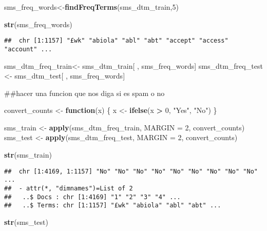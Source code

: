 \documentclass[]{article}
\newenvironment{Shaded}{\begin{snugshade}}{\end{snugshade}}
\newcommand{\KeywordTok}[1]{\textcolor[rgb]{0.13,0.29,0.53}{\textbf{#1}}}
\newcommand{\DataTypeTok}[1]{\textcolor[rgb]{0.13,0.29,0.53}{#1}}
\newcommand{\DecValTok}[1]{\textcolor[rgb]{0.00,0.00,0.81}{#1}}
\newcommand{\StringTok}[1]{\textcolor[rgb]{0.31,0.60,0.02}{#1}}
\newcommand{\ControlFlowTok}[1]{\textcolor[rgb]{0.13,0.29,0.53}{\textbf{#1}}}
\newcommand{\OperatorTok}[1]{\textcolor[rgb]{0.81,0.36,0.00}{\textbf{#1}}}
\newcommand{\NormalTok}[1]{#1}
\begin{document}
\begin{Shaded}
\begin{Highlighting}[]
\NormalTok{sms_freq_words<-}\KeywordTok{findFreqTerms}\NormalTok{(sms_dtm_train,}\DecValTok{5}\NormalTok{)}

\KeywordTok{str}\NormalTok{(sms_freq_words)}
\end{Highlighting}
\end{Shaded}

\begin{verbatim}
##  chr [1:1157] "£wk" "abiola" "abl" "abt" "accept" "access" "account" ...
\end{verbatim}

\begin{Shaded}
\begin{Highlighting}[]
\NormalTok{sms_dtm_freq_train<-}\StringTok{ }\NormalTok{sms_dtm_train[ , sms_freq_words]}
\NormalTok{sms_dtm_freq_test <-}\StringTok{ }\NormalTok{sms_dtm_test[ , sms_freq_words]         }


\NormalTok{##hacer una funcion que nos diga si es spam o no}

\NormalTok{convert_counts <-}\StringTok{ }\ControlFlowTok{function}\NormalTok{(x) \{}
\NormalTok{    x <-}\StringTok{ }\KeywordTok{ifelse}\NormalTok{(x }\OperatorTok{>}\StringTok{ }\DecValTok{0}\NormalTok{, }\StringTok{"Yes"}\NormalTok{, }\StringTok{"No"}\NormalTok{)}
\NormalTok{\}}


\NormalTok{sms_train <-}\StringTok{ }\KeywordTok{apply}\NormalTok{(sms_dtm_freq_train, }\DataTypeTok{MARGIN =} \DecValTok{2}\NormalTok{,}
\NormalTok{                                       convert_counts)}
\NormalTok{sms_test <-}\StringTok{ }\KeywordTok{apply}\NormalTok{(sms_dtm_freq_test, }\DataTypeTok{MARGIN =} \DecValTok{2}\NormalTok{,}
\NormalTok{                                      convert_counts)}

\KeywordTok{str}\NormalTok{(sms_train)}
\end{Highlighting}
\end{Shaded}

\begin{verbatim}
##  chr [1:4169, 1:1157] "No" "No" "No" "No" "No" "No" "No" "No" "No" ...
##  - attr(*, "dimnames")=List of 2
##   ..$ Docs : chr [1:4169] "1" "2" "3" "4" ...
##   ..$ Terms: chr [1:1157] "£wk" "abiola" "abl" "abt" ...
\end{verbatim}

\begin{Shaded}
\begin{Highlighting}[]
\KeywordTok{str}\NormalTok{(sms_test)}
\end{Highlighting}
\end{Shaded}
\end{document}
